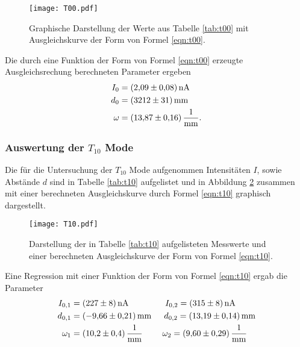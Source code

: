 

\begin{figure}[htb]
  \centering
  \texttt{[image: T00.pdf]}
  \caption{Graphische Darstellung der Werte aus Tabelle \ref{tab:t00} mit Ausgleichskurve der Form von Formel \ref{eqn:t00}.}
  \label{plt:t00}
\end{figure}

Die durch eine Funktion der Form von Formel \ref{eqn:t00} erzeugte Ausgleichsrechung berechneten Parameter
ergeben
\begin{align*}
  I_0 &= \SI{2.09(8)}{\nano\ampere} \\
  d_0 &= \SI{3212(31)}{\milli\meter} \\
  \omega &= \SI{13.87(16)}{\raiseto{-1}\milli\meter}.
\end{align*}
\FloatBarrier

\subsubsection{Auswertung der $T_{10}$ Mode}

Die für die Untersuchung der $T_{10}$ Mode aufgenommen Intensitäten $I$,
sowie Abstände $d$ sind in Tabelle \ref{tab:t10} aufgelistet und in
Abbildung \ref{plt:t10} zusammen mit einer berechneten Ausgleichskurve durch
Formel \ref{eqn:t10} graphisch dargestellt.



\begin{figure}[htb]
  \centering
  \texttt{[image: T10.pdf]}
  \caption{Darstellung der in Tabelle \ref{tab:t10} aufgelisteten Messwerte und einer berechneten Ausgleichskurve der Form von Formel \ref{eqn:t10}.}
  \label{plt:t10}
\end{figure}

Eine Regression mit einer Funktion der Form von Formel \ref{eqn:t10} ergab die Parameter
\begin{align*}
  I_{0,1} &= \SI{227(8)}{\nano\ampere} \ \ \ \ \ \ \ \ \ \ \ \ \ I_{0,2} = \SI{315(8)}{\nano\ampere} \\
  d_{0,1} &= \SI{-9.66(21)}{\milli\meter} \, \ \ \ \ d_{0,2} = \SI{13.19(14)}{\milli\meter} \\
  \omega_1 &= \SI{10.2(4)}{\raiseto{-1}\milli\meter} \ \ \ \ \ \ \ \omega_2 = \SI{9.60(29)}{\raiseto{-1}\milli\meter}
\end{align*}
\FloatBarrier

